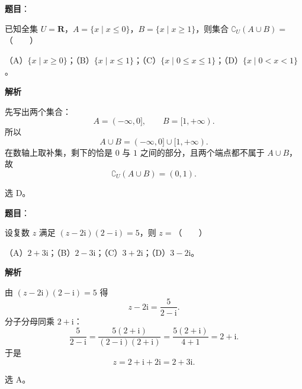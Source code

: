 

\begin{answer}

\textbf{题目}：

已知全集 $U=\mathbf R$，$A=\{x\mid x\leqslant 0\}$，$B=\{x\mid x\geqslant 1\}$，则集合 $\complement_U(A\cup B)=$\mbox{（　　）}

（A）$\{x\mid x\geqslant 0\}$；（B）$\{x\mid x\leqslant 1\}$；（C）$\{x\mid 0\leqslant x\leqslant 1\}$；（D）$\{x\mid 0<x<1\}$。

\textbf{解析}

先写出两个集合：
\nopagebreak[4]
\[A=(-\infty,0],\qquad B=[1,+\infty).\]
所以
\nopagebreak[4]
\[A\cup B=(-\infty,0]\cup[1,+\infty).\]
在数轴上取补集，剩下的恰是 $0$ 与 $1$ 之间的部分，且两个端点都不属于 $A\cup B$，故
\nopagebreak[4]
\[\complement_U(A\cup B)=(0,1).\]

选 D。

\gkanswer{答案：D。$A\cup B=(-\infty,0]\cup[1,+\infty)$，其补集为 $(0,1)$。}

\end{answer}
\begin{answer}

\textbf{题目}：

设复数 $z$ 满足 $(z-2\mathrm i)(2-\mathrm i)=5$，则 $z=$\mbox{（　　）}

（A）$2+3\mathrm i$；（B）$2-3\mathrm i$；（C）$3+2\mathrm i$；（D）$3-2\mathrm i$。

\textbf{解析}

由 $(z-2\mathrm i)(2-\mathrm i)=5$ 得
\nopagebreak[4]
\[z-2\mathrm i=\frac5{2-\mathrm i}.\]
分子分母同乘 $2+\mathrm i$：
\nopagebreak[4]
\[\frac5{2-\mathrm i}=\frac{5(2+\mathrm i)}{(2-\mathrm i)(2+\mathrm i)}
=\frac{5(2+\mathrm i)}{4+1}=2+\mathrm i.\]
于是
\nopagebreak[4]
\[z=2+\mathrm i+2\mathrm i=2+3\mathrm i.\]

选 A。


\end{answer}
